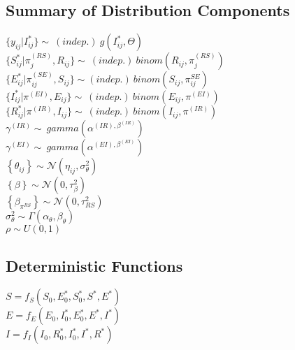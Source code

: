 \documentclass[12pt]{article}
\newcommand \noi {\noindent}
\begin{document}
\subsection{Summary of Distribution Components}
\noi $\{y_{ij} | I^*_{ij}\} \sim\ (indep.)\ g(I^*_{ij}, \Theta)$\\

\noi $\{S_{ij}^* | \pi_j^{(RS)}, R_{ij}\} \sim\ (indep.)\  binom(R_{ij}, \pi_j^{(RS)})$\\

\noi $\{E_{ij}^* | \pi^{(SE)}_{ij}, S_{ij} \} \sim (indep.)\ binom(S_{ij}, \pi^{SE}_{ij})$ \\

\noi $\{I_{ij}^* | \pi^{(EI)}, E_{ij} \} \sim\ (indep.)\ binom(E_{ij}, \pi^{(EI)})$\\

\noi $\{R_{ij}^* | \pi^{(IR)}, I_{ij}\} \sim\ (indep.)\ binom(I_{ij}, \pi^{(IR)})$\\

\noi $\gamma^{(IR)} \sim\ gamma(\alpha^{(IR), \beta^{(IR)}})$\\ 

\noi $\gamma^{(EI)} \sim\ gamma(\alpha^{(EI), \beta^{(EI)}})$\\ 

\noi $\left\{ \theta_{ij}\right\} \sim \mathcal{N}(\eta_{ij}, \sigma^2_{\theta})$ \\

\noi $\left\{ \beta \right\} \sim \mathcal{N}(0, \tau^2_\beta) $\\ 

\noi $\left\{ \beta_{\pi^{RS}} \right\} \sim \mathcal{N}(0, \tau^2_{RS}) $\\ 

\noi $\sigma^2_{\theta} \sim \Gamma(\alpha_\theta, \beta_\theta)$\\

\noi $\rho \sim U(0,1)$


\subsection{Deterministic Functions}

\noi $S = f_S(S_0, E^*_0, S^*_0, S^*, E^*)$ \\

\noi $E = f_E(E_0, I^*_0, E^*_0, E^*, I^*)$ \\

\noi $I = f_I(I_0, R^*_0, I^*_0, I^*, R^*)$ \\
\end{document}

